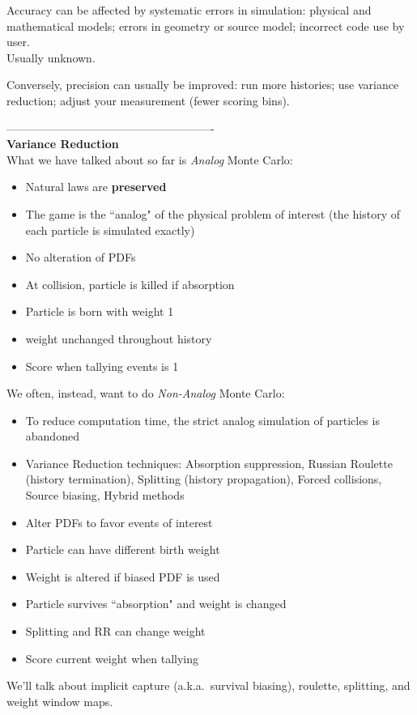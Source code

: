 \documentclass[12pt]{article}
\begin{document}
Accuracy can be affected by systematic errors in simulation: physical and mathematical models; errors in geometry or source model; incorrect code use by user.\\
Usually unknown.

Conversely, precision can usually be improved: run more histories; use variance reduction; adjust your measurement (fewer scoring bins).

\vspace*{1 em}
-------------------------------------------------------\\
\textbf{Variance Reduction}\\
What we have talked about so far is \textit{Analog} Monte Carlo:
\begin{itemize}
    \item Natural laws are \textbf{preserved}
    \item The game is the ``analog" of the physical problem of interest (the history of each particle is simulated exactly)
    \item No alteration of PDFs
    \item At collision, particle is killed if absorption
    \item Particle is born with weight 1
    \item weight unchanged throughout history
    \item Score when tallying events is 1
\end{itemize}
%
We often, instead, want to do \textit{Non-Analog} Monte Carlo:
\begin{itemize}
    \item To reduce computation time, the strict analog simulation of particles is abandoned
    \item Variance Reduction techniques: Absorption suppression, Russian Roulette (history termination), Splitting (history propagation), Forced collisions, Source biasing, Hybrid methods
    \item Alter PDFs to favor events of interest
    \item Particle can have different birth weight
    \item Weight is altered if biased PDF is used
    \item Particle survives ``absorption" and weight is changed
    \item Splitting and RR can change weight
    \item Score current weight when tallying
\end{itemize}
%
We'll talk about implicit capture (a.k.a.\ survival biasing), roulette, splitting, and weight window maps. 
\end{document}
